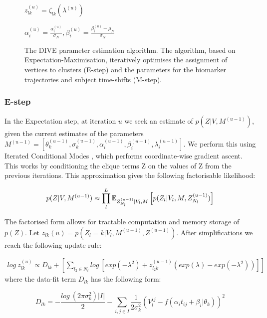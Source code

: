 \begin{figure}
\begin{algorithm}[H]
{  
  $z_{lk}^{(u)} = \zeta_{lk}(\lambda^{(u)})$
  }

  $\alpha_i^{(u)} = \frac{\alpha_i^{(u)}}{\sigma_N}, \beta_i^{(u)} = \frac{\beta_i^{(u)} - \mu_N}{\sigma_N}$   
\end{algorithm}
\caption[The DIVE parameter estimation algorithm.]{The DIVE parameter estimation algorithm. The algorithm, based on Expectation-Maximisation, iteratively optimises the assignment of vertices to clusters (E-step) and the parameters for the biomarker trajectories and subject time-shifts (M-step). }
\label{fig:algo_vwdpm}
\end{figure}
\subsubsection{E-step}

In the Expectation step, at iteration $u$ we seek an estimate of $p(Z | V, M^{(u-1)})$, given the current estimates of the parameters $M^{(u-1)} =[ \theta_k^{(u-1)}, \sigma_k^{(u-1)}, \alpha_i^{(u-1)}, \beta_i^{(u-1)}, \lambda_i^{(u-1)}]$. We perform this using Iterated Conditional Modes \cite{bishop2007pattern}, which performs coordinate-wise gradient ascent. This works by conditioning the clique terms Z on the values of Z from the previous iterations.  This approximation gives the following factorisable likelihood:

\begin{equation}
\label{eq:e_approx}
 p(Z | V, M^{(u-1)}) \approx \prod_l^L \mathbb{E}_{Z_{N_l}^{(u-1)}|V_l, M} \left[ p(Z_l|V_l, M, Z_{N_l}^{(u-1)}) \right]
\end{equation}

The factorised form allows for tractable computation and memory storage of $p(Z)$. Let $z_{lk}(u) = p(Z_l = k | V_l, M^{(u-1)},Z^{(u-1)})$. After simplifications we reach the following update rule:

\begin{equation}
\label{eq:e-step}
\begin{split}
 log\ z_{lk}^{(u)} \propto D_{lk}+ \left[ \sum_{l_2 \in N_l} log\ \left[ exp(-\lambda^2) + z_{l_2k}^{(u-1)} (exp(\lambda) - exp(-\lambda^2)) \right] \right]
\end{split}
\end{equation}
where the data-fit term $D_{lk}$ has the following form:

\begin{equation}
\label{eq:e-step_Dlk}
D_{lk} = -\frac{log\ (2 \pi \sigma_k^2) |I|}{2} - \sum_{i,j \in I}  \frac{1}{2\sigma_k^2}(V_l^{ij} - f(\alpha_i t_{ij} + \beta_i | \theta_k))^2 
\end{equation}

